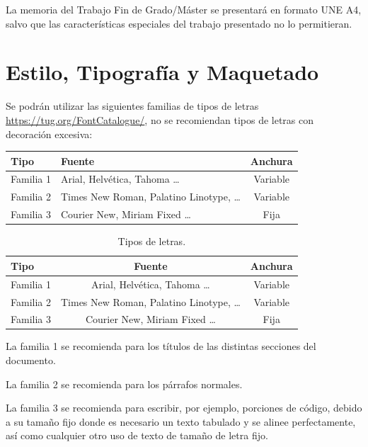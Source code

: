 La memoria del Trabajo Fin de Grado/Máster se presentará en formato  UNE  A4,  salvo  que  las  características  especiales  del  trabajo  presentado  no  lo permitieran.

\section {Estilo,  Tipografía y    Maquetado}

Se podrán utilizar las siguientes familias de tipos de letras \url{https://tug.org/FontCatalogue/}, no se recomiendan tipos de letras con decoración excesiva:

	\begin{center}
	\begin{tabular}{p{2cm}p{7.5cm}c}
		\textbf{Tipo} & \textbf{Fuente} & \textbf{Anchura} \\ \hline
         Familia 1 & Arial, Helvética, Tahoma  	\ldots & Variable \\
         Familia 2 & Times New Roman, Palatino  Linotype,  	\ldots & Variable  \\
         Familia 3 & Courier  New,  Miriam Fixed \ldots & Fija\\
         \hline
	\end{tabular}
	\end{center}



\begin{table} 
	\begin{center}
	\begin{tabular}{l c c}
		\textbf{Tipo} & \textbf{Fuente} & \textbf{Anchura} \\ \hline
         Familia 1 & Arial, Helvética, Tahoma  	\ldots & Variable \\
         Familia 2 & Times New Roman, Palatino  Linotype,  	\ldots & Variable  \\
         Familia 3 & Courier  New,  Miriam Fixed \ldots & Fija \\
         \hline
	\end{tabular}
	\end{center}

	\caption{\label{tab:letras}Tipos de letras.}
\end{table}


La familia 1 se recomienda para los títulos de las distintas secciones del documento.

La familia 2 se recomienda para los párrafos normales.

La familia 3 se recomienda para escribir, por ejemplo, porciones de código, debido a su tamaño fijo donde es necesario un texto tabulado y se alinee perfectamente, así como cualquier otro uso de texto de tamaño de letra fijo.

